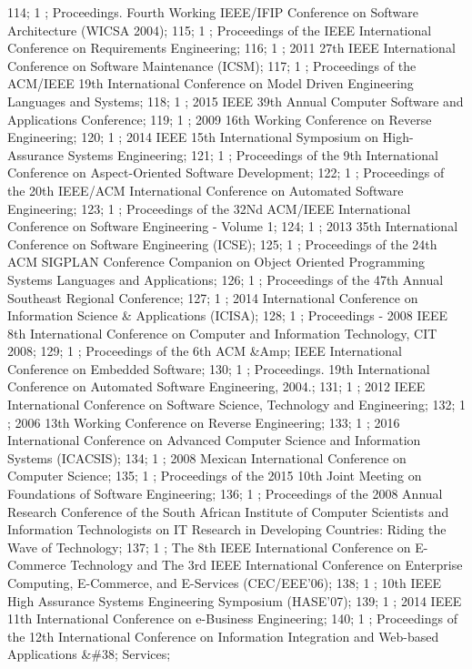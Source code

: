 114; 1 ; Proceedings. Fourth Working IEEE/IFIP Conference on Software Architecture (WICSA 2004); 
115; 1 ; Proceedings of the IEEE International Conference on Requirements Engineering; 
116; 1 ; 2011 27th IEEE International Conference on Software Maintenance (ICSM); 
117; 1 ; Proceedings of the ACM/IEEE 19th International Conference on Model Driven Engineering Languages and Systems; 
118; 1 ; 2015 IEEE 39th Annual Computer Software and Applications Conference; 
119; 1 ; 2009 16th Working Conference on Reverse Engineering; 
120; 1 ; 2014 IEEE 15th International Symposium on High-Assurance Systems Engineering; 
121; 1 ; Proceedings of the 9th International Conference on Aspect-Oriented Software Development; 
122; 1 ; Proceedings of the 20th IEEE/ACM International Conference on Automated Software Engineering; 
123; 1 ; Proceedings of the 32Nd ACM/IEEE International Conference on Software Engineering - Volume 1; 
124; 1 ; 2013 35th International Conference on Software Engineering (ICSE); 
125; 1 ; Proceedings of the 24th ACM SIGPLAN Conference Companion on Object Oriented Programming Systems Languages and Applications; 
126; 1 ; Proceedings of the 47th Annual Southeast Regional Conference; 
127; 1 ; 2014 International Conference on Information Science {\&} Applications (ICISA); 
128; 1 ; Proceedings - 2008 IEEE 8th International Conference on Computer and Information Technology, CIT 2008; 
129; 1 ; Proceedings of the 6th ACM {\&}Amp; IEEE International Conference on Embedded Software; 
130; 1 ; Proceedings. 19th International Conference on Automated Software Engineering, 2004.; 
131; 1 ; 2012 IEEE International Conference on Software Science, Technology and Engineering; 
132; 1 ; 2006 13th Working Conference on Reverse Engineering; 
133; 1 ; 2016 International Conference on Advanced Computer Science and Information Systems (ICACSIS); 
134; 1 ; 2008 Mexican International Conference on Computer Science; 
135; 1 ; Proceedings of the 2015 10th Joint Meeting on Foundations of Software Engineering; 
136; 1 ; Proceedings of the 2008 Annual Research Conference of the South African Institute of Computer Scientists and Information Technologists on IT Research in Developing Countries: Riding the Wave of Technology; 
137; 1 ; The 8th IEEE International Conference on E-Commerce Technology and The 3rd IEEE International Conference on Enterprise Computing, E-Commerce, and E-Services (CEC/EEE'06); 
138; 1 ; 10th IEEE High Assurance Systems Engineering Symposium (HASE'07); 
139; 1 ; 2014 IEEE 11th International Conference on e-Business Engineering; 
140; 1 ; Proceedings of the 12th International Conference on Information Integration and Web-based Applications {\&}{\#}38; Services; 
